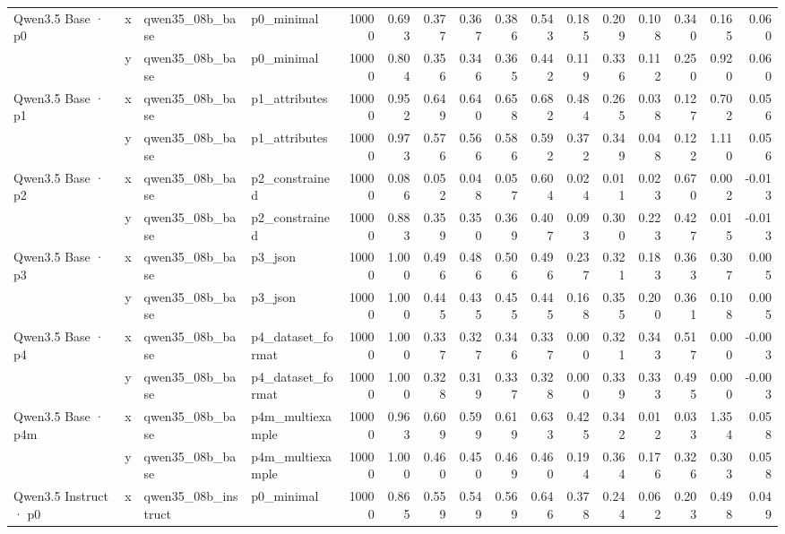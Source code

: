 \begin{tabular}{llllrrrrrrrrrrrr}
\cline{1-16}
\multirow[t]{2}{*}{Qwen3.5 Base · p0} & x & qwen35\_08b\_base & p0\_minimal & 10000 & 0.693 & 0.377 & 0.367 & 0.386 & 0.543 & 0.185 & 0.209 & 0.108 & 0.340 & 0.165 & 0.060 \\
 & y & qwen35\_08b\_base & p0\_minimal & 10000 & 0.804 & 0.356 & 0.346 & 0.365 & 0.442 & 0.119 & 0.336 & 0.112 & 0.250 & 0.920 & 0.060 \\
\cline{1-16}
\multirow[t]{2}{*}{Qwen3.5 Base · p1} & x & qwen35\_08b\_base & p1\_attributes & 10000 & 0.952 & 0.649 & 0.640 & 0.658 & 0.682 & 0.484 & 0.265 & 0.038 & 0.127 & 0.702 & 0.056 \\
 & y & qwen35\_08b\_base & p1\_attributes & 10000 & 0.973 & 0.576 & 0.566 & 0.586 & 0.592 & 0.372 & 0.349 & 0.048 & 0.122 & 1.110 & 0.056 \\
\cline{1-16}
\multirow[t]{2}{*}{Qwen3.5 Base · p2} & x & qwen35\_08b\_base & p2\_constrained & 10000 & 0.086 & 0.052 & 0.048 & 0.057 & 0.604 & 0.024 & 0.011 & 0.023 & 0.670 & 0.002 & -0.013 \\
 & y & qwen35\_08b\_base & p2\_constrained & 10000 & 0.883 & 0.359 & 0.350 & 0.369 & 0.407 & 0.093 & 0.300 & 0.223 & 0.427 & 0.015 & -0.013 \\
\cline{1-16}
\multirow[t]{2}{*}{Qwen3.5 Base · p3} & x & qwen35\_08b\_base & p3\_json & 10000 & 1.000 & 0.496 & 0.486 & 0.506 & 0.496 & 0.237 & 0.321 & 0.183 & 0.363 & 0.307 & 0.005 \\
 & y & qwen35\_08b\_base & p3\_json & 10000 & 1.000 & 0.445 & 0.435 & 0.455 & 0.445 & 0.168 & 0.355 & 0.200 & 0.361 & 0.108 & 0.005 \\
\cline{1-16}
\multirow[t]{2}{*}{Qwen3.5 Base · p4} & x & qwen35\_08b\_base & p4\_dataset\_format & 10000 & 1.000 & 0.337 & 0.327 & 0.346 & 0.337 & 0.000 & 0.321 & 0.343 & 0.517 & 0.000 & -0.003 \\
 & y & qwen35\_08b\_base & p4\_dataset\_format & 10000 & 1.000 & 0.328 & 0.319 & 0.337 & 0.328 & 0.000 & 0.339 & 0.333 & 0.495 & 0.000 & -0.003 \\
\cline{1-16}
\multirow[t]{2}{*}{Qwen3.5 Base · p4m} & x & qwen35\_08b\_base & p4m\_multiexample & 10000 & 0.963 & 0.609 & 0.599 & 0.619 & 0.633 & 0.425 & 0.342 & 0.012 & 0.033 & 1.354 & 0.058 \\
 & y & qwen35\_08b\_base & p4m\_multiexample & 10000 & 1.000 & 0.460 & 0.450 & 0.469 & 0.460 & 0.194 & 0.364 & 0.176 & 0.326 & 0.303 & 0.058 \\
\cline{1-16}
\multirow[t]{2}{*}{Qwen3.5 Instruct · p0} & x & qwen35\_08b\_instruct & p0\_minimal & 10000 & 0.865 & 0.559 & 0.549 & 0.569 & 0.646 & 0.378 & 0.244 & 0.062 & 0.203 & 0.498 & 0.049 \\

\end{tabular}
